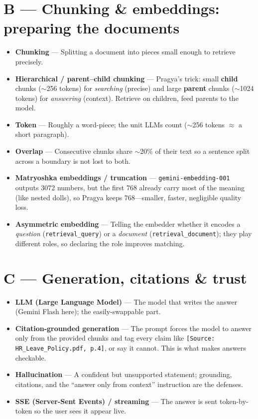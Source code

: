 \documentclass[11pt,a4paper,oneside]{report}
\newcommand{\code}[1]{\texttt{#1}}
\begin{document}
\section{B --- Chunking \& embeddings: preparing the documents}
\begin{itemize}
  \item \textbf{Chunking} --- Splitting a document into pieces small enough to retrieve precisely.
  \item \textbf{Hierarchical / parent--child chunking} --- Pragya's trick: small \textbf{child} chunks
  ($\sim$256 tokens) for \emph{searching} (precise) and large \textbf{parent} chunks ($\sim$1024 tokens)
  for \emph{answering} (context). Retrieve on children, feed parents to the model.
  \item \textbf{Token} --- Roughly a word-piece; the unit LLMs count ($\sim$256 tokens $\approx$ a short
  paragraph).
  \item \textbf{Overlap} --- Consecutive chunks share $\sim$20\% of their text so a sentence split across
  a boundary is not lost to both.
  \item \textbf{Matryoshka embeddings / truncation} --- \code{gemini-embedding-001} outputs 3072 numbers,
  but the first 768 already carry most of the meaning (like nested dolls), so Pragya keeps 768---smaller,
  faster, negligible quality loss.
  \item \textbf{Asymmetric embedding} --- Telling the embedder whether it encodes a \emph{question}
  (\code{retrieval\_query}) or a \emph{document} (\code{retrieval\_document}); they play different roles,
  so declaring the role improves matching.
\end{itemize}

\section{C --- Generation, citations \& trust}
\begin{itemize}
  \item \textbf{LLM (Large Language Model)} --- The model that writes the answer (Gemini Flash here); the
  easily-swappable part.
  \item \textbf{Citation-grounded generation} --- The prompt forces the model to answer only from the
  provided chunks and tag every claim like \code{[Source: HR\_Leave\_Policy.pdf, p.4]}, or say it cannot.
  This is what makes answers checkable.
  \item \textbf{Hallucination} --- A confident but unsupported statement; grounding, citations, and the
  ``answer only from context'' instruction are the defenses.
  \item \textbf{SSE (Server-Sent Events) / streaming} --- The answer is sent token-by-token so the user
  sees it appear live.
\end{itemize}
\end{document}
